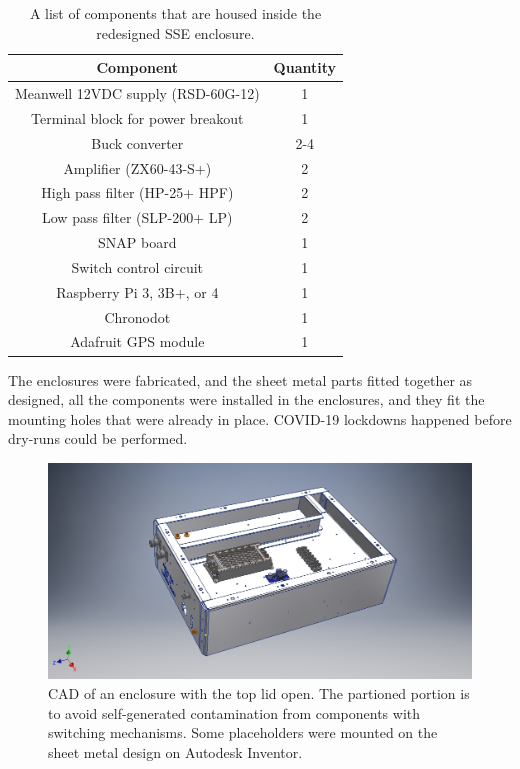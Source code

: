 \begin{table}
	\centering
	\begin{tabular}{ c|c}
		\hline
		Component & Quantity \\
		\hline
		\hline
		Meanwell 12VDC supply (RSD-60G-12) & 1 \\
		Terminal block for power breakout & 1 \\
		Buck converter & 2-4 \\
		Amplifier (ZX60-43-S+) & 2 \\
		High pass filter (HP-25+ HPF) & 2 \\
		Low pass filter (SLP-200+ LP) & 2 \\
		SNAP board	& 1 \\
		Switch control circuit & 1 \\
		Raspberry Pi 3, 3B+, or 4 & 1 \\
		Chronodot & 1 \\
		Adafruit GPS module & 1 \\		 
		\hline
	\end{tabular}
	\caption{A list of components that are housed inside the redesigned SSE enclosure.}
	\label{Tab:Components}
\end{table}

The enclosures were fabricated, and the sheet metal parts fitted together as designed, all the components were installed in the enclosures, and they fit the mounting holes that were already in place. COVID-19 lockdowns happened before dry-runs could be performed. 

\begin{figure}
	\centering
	\includegraphics[width=\linewidth]{"Figures/Top Open"} 
	\caption{CAD of an enclosure with the top lid open. The partioned portion is to avoid self-generated contamination from components with switching mechanisms. Some placeholders were mounted on the sheet metal design on Autodesk Inventor.} 
	\label{Fig:Top Open}
\end{figure}

